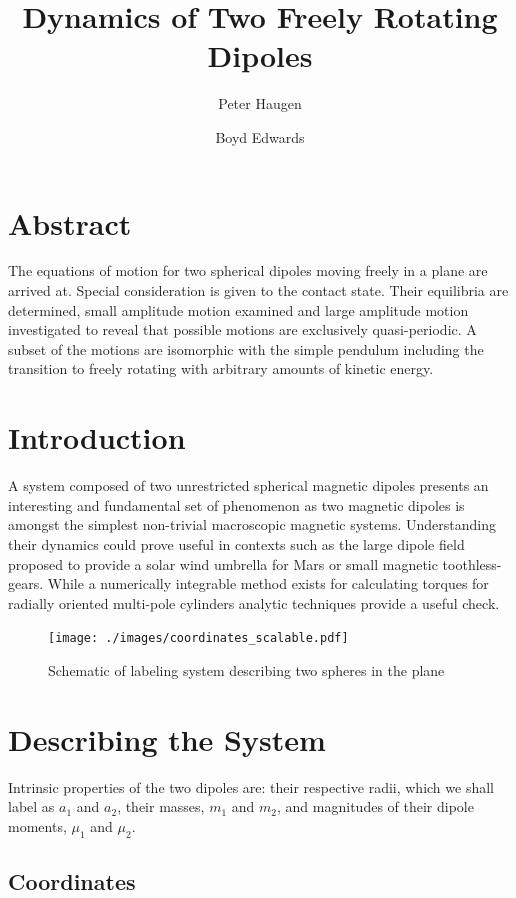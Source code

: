 \documentclass[prbg,preprint]{revtex4-1}
\begin{document}
\title{Dynamics of Two Freely Rotating Dipoles}
\author{Peter Haugen}
\author{Boyd Edwards}

\maketitle

\section{Abstract}
	The equations of motion for two spherical dipoles moving freely in a plane are arrived at. Special consideration is given to the contact state. Their equilibria are determined, small amplitude motion examined and large amplitude motion investigated to reveal that possible motions are exclusively quasi-periodic. A subset of the motions are isomorphic with the simple pendulum including the transition to freely rotating with arbitrary amounts of kinetic energy.
	
\section{Introduction}
A system composed of two unrestricted spherical magnetic dipoles presents an interesting and fundamental set of phenomenon as two magnetic dipoles is amongst the simplest non-trivial macroscopic magnetic systems. Understanding their dynamics could prove useful in contexts such as the large dipole field proposed to provide a solar wind umbrella for Mars\cite{2017LPICo1989.8250G} or small magnetic toothless-gears\cite{doi:10.1119/1.5029823}.
While a numerically integrable method exists for calculating torques for radially oriented multi-pole cylinders\cite{Furlani:1995aa}  analytic techniques provide a useful check.

\begin{figure}[h]
  \centering
  \texttt{[image: ./images/coordinates\_scalable.pdf]}
  \caption{Schematic of labeling system describing two spheres in the plane}
\end{figure}


\section{Describing the System}
Intrinsic properties of the two dipoles are: their respective radii, which we shall label as $a_1$ and $a_2$, their masses, $m_1$ and $m_2$, and magnitudes of their dipole moments, $\mu_1$ and $\mu_2$.
\subsection{Coordinates}
\end{document}

